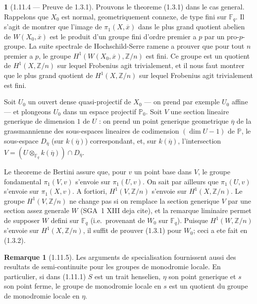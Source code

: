 \documentclass[12pt,a4paper]{article}
\theoremstyle{plain}
\theoremstyle{definition}
\newtheorem{remarque}[theorem]{Remarque}
\theoremstyle{definition}
\newtheorem{para}{}[section]
\theoremstyle{remark}
\begin{document}
\begin{para}[1.11.4 --- Preuve de 1.3.1]
Prouvons le theoreme (1.3.1) dans le cas general. Rappelons que $X_0$ est normal, geometriquement connexe, de type fini sur $\mathbb{F}_q$. Il s'agit de montrer que l'image de $\pi_1(X, \overline{x})$ dans le plus grand quotient abelien de $W(X_0, \overline{x})$ est le produit d'un groupe fini d'ordre premier a $p$ par un pro-$p$-groupe. La suite spectrale de Hochschild-Serre ramene a prouver que pour tout $n$ premier a $p$, le groupe $H^1(W(X_0, \overline{x}), \mathbb{Z}/n)$ est fini. Ce groupe est un quotient de $H^1(X, \mathbb{Z}/n)$ sur lequel Frobenius agit trivialement, et il nous faut montrer que le plus grand quotient de $H^1(X, \mathbb{Z}/n)$ sur lequel Frobenius agit trivialement est fini.

Soit $U_0$ un ouvert dense quasi-projectif de $X_0$ --- on prend par exemple $U_0$ affine --- et plongeons $U_0$ dans un espace projectif $\mathbb{P}_0$. Soit $V$ une section lineaire generique de dimension $1$ de $U$ : on prend un point generique geometrique $\overline{\eta}$ de la grassmannienne des sous-espaces lineaires de codimension $(\dim U - 1)$ de $\mathbb{P}$, le sous-espace $D_{\overline{\eta}}$ (sur $k(\overline{\eta})$) correspondant, et, sur $k(\overline{\eta})$, l'intersection $V = (U \otimes_{\mathbb{F}_q} k(\overline{\eta})) \cap D_{\overline{\eta}}$.

Le theoreme de Bertini assure que, pour $v$ un point base dans $V$, le groupe fondamental $\pi_1(V, v)$ s'envoie sur $\pi_1(U, v)$. On sait par ailleurs que $\pi_1(U, v)$ s'envoie sur $\pi_1(X, v)$. A fortiori, $H^1(V, \mathbb{Z}/n)$ s'envoie sur $H^1(X, \mathbb{Z}/n)$. Le groupe $H^1(V, \mathbb{Z}/n)$ ne change pas si on remplace la section generique $V$ par une section assez generale $W$ (SGA~1 XIII deja cite), et la remarque liminaire permet de supposer $W$ defini sur $\mathbb{F}_q$ (i.e.~provenant de $W_0$ sur $\mathbb{F}_q$). Puisque $H^1(W, \mathbb{Z}/n)$ s'envoie sur $H^1(X, \mathbb{Z}/n)$, il suffit de prouver (1.3.1) pour $W_0$; ceci a ete fait en (1.3.2).
\end{para}

\begin{remarque}[1.11.5]
Les arguments de specialisation fournissent aussi des resultats de semi-continuite pour les groupes de monodromie locale. En particulier, si dans (1.11.1) $S$ est un trait henselien, $\eta$ son point generique et $s$ son point ferme, le groupe de monodromie locale en $s$ est un quotient du groupe de monodromie locale en $\eta$.
\end{remarque}
\end{document}
